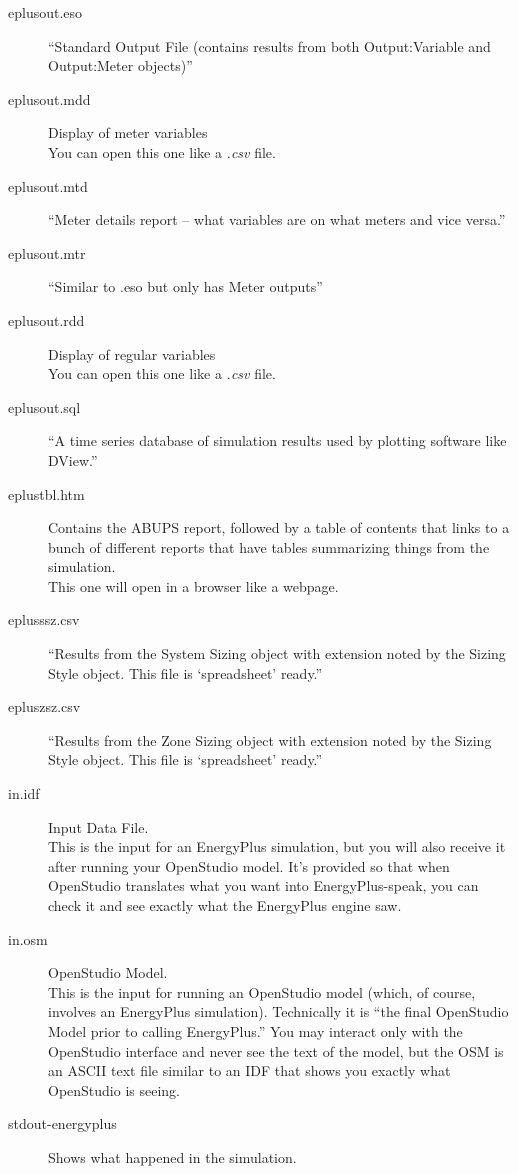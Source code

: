 \documentclass[10pt]{article}
\begin{document}
\begin{description}
\item[eplusout.eso] ``Standard Output File (contains results from both Output:Variable
and Output:Meter objects)'' \cite{EPdocs9inputoutput}
\item[eplusout.mdd] Display of meter variables \cite{EPdocs9inputoutput}\\ You can open this one like a \textit{.csv} file.
\item[eplusout.mtd] ``Meter details report -- what variables are on what meters and vice
versa.'' \cite{EPdocs9inputoutput}
\item[eplusout.mtr] ``Similar to .eso but only has Meter outputs'' \cite{EPdocs9inputoutput}
\item[eplusout.rdd] Display of regular variables \cite{EPdocs9inputoutput}\\ You can open this one like a \textit{.csv} file.
\item[eplusout.sql] ``A time series database of simulation results used by plotting software like DView.'' \cite{OpenStudio-book}
\item[eplustbl.htm] Contains the ABUPS report, followed by a table of contents that links to a bunch of different reports that have tables summarizing things from the simulation.\\ This one will open in a browser like a webpage.
\item[eplusssz.csv] ``Results from the System Sizing object with extension noted by the
Sizing Style object. This file is `spreadsheet' ready.'' \cite{EPdocs9inputoutput}
\item[epluszsz.csv] ``Results from the Zone Sizing object with extension noted by the
Sizing Style object. This file is `spreadsheet' ready.'' \cite{EPdocs9inputoutput}
\item[in.idf] Input Data File.\\ This is the input for an EnergyPlus simulation, but you will also receive it after running your OpenStudio model. It's provided so that when OpenStudio translates what you want into EnergyPlus-speak, you can check it and see exactly what the EnergyPlus engine saw.
\item[in.osm] OpenStudio Model.\\ This is the input for running an OpenStudio model (which, of course, involves an EnergyPlus simulation). Technically it is ``the final OpenStudio Model prior to calling EnergyPlus.'' \cite{OpenStudio-book} You may interact only with the OpenStudio interface and never see the text of the model, but the OSM is an ASCII text file similar to an IDF that shows you exactly what OpenStudio is seeing.
\item[stdout-energyplus] Shows what happened in the simulation.





\end{description}
\end{document}
